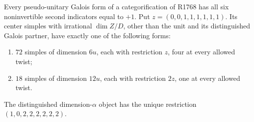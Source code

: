 \begin{proposition}
\label{prop:creative-r1768-sector}
Every pseudo-unitary Galois form of a categorification of R1768 has all
six noninvertible second indicators equal to $+1$.
Put $z=(0,0,1,1,1,1,1,1)$. Its center simples with irrational $\dim Z/D$, other than the unit
and its distinguished Galois partner, have exactly one of the following
forms:
\begin{enumerate}
\item $72$ simples of dimension $6u$, each with restriction $z$,
      four at every allowed twist;
\item $18$ simples of dimension $12u$, each with restriction $2z$,
      one at every allowed twist.
\end{enumerate}
The distinguished dimension-$\alpha$ object has the unique restriction
$(1,0,2,2,2,2,2,2)$.
\end{proposition}
